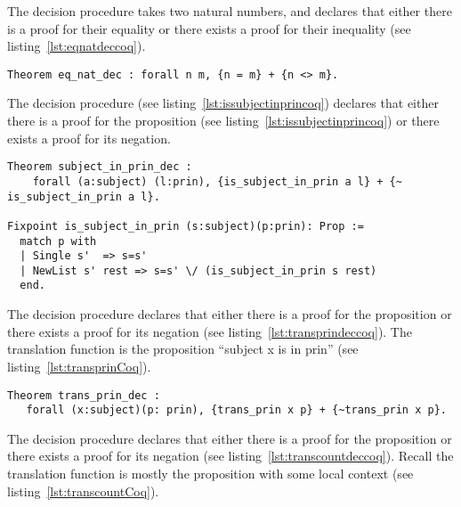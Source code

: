 The decision procedure  takes two natural numbers, and declares that either there is a proof for their equality or there exists a proof for their inequality (see listing~\ref{lst:eqnatdeccoq}).

\begin{lstlisting}
Theorem eq_nat_dec : forall n m, {n = m} + {n <> m}.
\end{lstlisting}

The decision procedure  (see listing~\ref{lst:issubjectinprincoq}) declares that either there is a proof for the proposition  (see listing~\ref{lst:issubjectinprincoq}) or there exists a proof for its negation. 

\begin{lstlisting}
Theorem subject_in_prin_dec :
    forall (a:subject) (l:prin), {is_subject_in_prin a l} + {~ is_subject_in_prin a l}.

Fixpoint is_subject_in_prin (s:subject)(p:prin): Prop :=
  match p with
  | Single s'  => s=s'
  | NewList s' rest => s=s' \/ (is_subject_in_prin s rest)
  end.
\end{lstlisting}

The decision procedure  declares that either there is a proof for the proposition  or there exists a proof for its negation (see listing~\ref{lst:transprindeccoq}). The translation function  is the proposition ``subject x is in prin'' (see listing~\ref{lst:transprinCoq}).

\begin{minipage}[c]{0.95\textwidth}
\begin{lstlisting}
Theorem trans_prin_dec :
   forall (x:subject)(p: prin), {trans_prin x p} + {~trans_prin x p}.
\end{lstlisting}
\end{minipage}

The decision procedure  declares that either there is a proof for the proposition  or there exists a proof for its negation (see listing~\ref{lst:transcountdeccoq}). Recall the translation function  is mostly the proposition  with some local context (see listing~\ref{lst:transcountCoq}).

